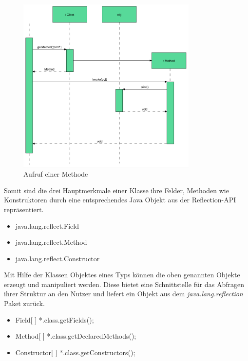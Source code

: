   \begin{figure}[h!]
    \centering
    \includegraphics[width=0.8\textwidth]{material/images/reflection-flussdiagram.png}
    \caption{Aufruf einer Methode}
    \label{fig:refl-fluss}
  \end{figure}

  \newpage Somit sind die drei Hauptmerkmale einer Klasse ihre Felder, Methoden wie Konstruktoren durch eine entsprechendes Java Objekt aus der Reflection-API repräsentiert. 

  \begin{itemize}
    \item java.lang.reflect.Field
    \item java.lang.reflect.Method
    \item java.lang.reflect.Constructor
  \end{itemize}

  Mit Hilfe der Klassen Objektes eines Typs können die oben genannten Objekte erzeugt und manipuliert werden. Diese bietet eine Schnittstelle für das Abfragen ihrer Struktur an den Nutzer und liefert ein Objekt aus dem \textit{java.lang.reflection} Paket zurück.

  \begin{itemize}
    \item Field[ ] *.class.getFields();
    \item Method[ ] *.class.getDeclaredMethods();
    \item Constructor[ ] *.class.getConstructors();
  \end{itemize}
  \bigbreak 

